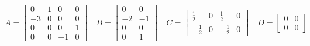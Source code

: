 \documentclass[11pt]{article}
\begin{document}
\begin{equation*}
	A=\begin{bmatrix} 0&1&0&0\\-3&0&0&0 \\ 0&0&0&1 \\ 0&0&-1&0 \end{bmatrix}\quad B=\begin{bmatrix} 0&0 \\ -2&-1 \\ 0&0 \\ 0&1 \end{bmatrix}\quad C=\begin{bmatrix} \frac{1}{2}&0&\frac{1}{2}&0 \\ -\frac{1}{2}&0&-\frac{1}{2}&0 \end{bmatrix}\quad D=\begin{bmatrix} 0&0 \\ 0&0 \end{bmatrix}
\end{equation*}
\end{document}
